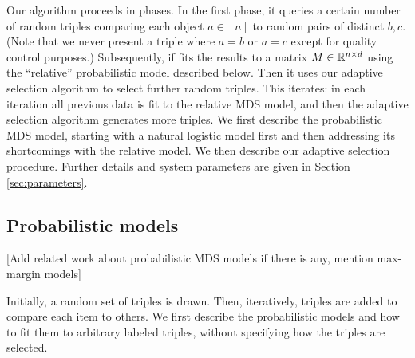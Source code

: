 \documentclass{article}
\begin{document}
Our algorithm proceeds in phases.  In the first phase, it queries a certain number of random triples comparing each object $a \in [n]$ to random pairs of distinct $b,c$.  (Note that we never present a triple where $a=b$ or $a=c$ except for quality control purposes.) Subsequently, if fits the results to a matrix $M \in \mathbb{R}^{n \times d}$ using the ``relative'' probabilistic model described below.  Then it uses our adaptive selection algorithm to select further random triples.  This iterates: in each iteration all previous data is fit to the relative MDS model, and then the adaptive selection algorithm generates more triples.  We first describe the probabilistic MDS model, starting with a natural logistic model first and then addressing its shortcomings with the relative model.  We then describe our adaptive selection procedure.  Further details and system parameters are given in Section \ref{sec:parameters}.

\subsection{Probabilistic models}

[Add related work about probabilistic MDS models if there is any, mention max-margin models]

Initially, a random set of triples is drawn.  Then, iteratively, triples are added to compare each item to others.  We first describe the probabilistic models and how to fit them to arbitrary labeled triples, without specifying how the triples are selected.
\end{document}
